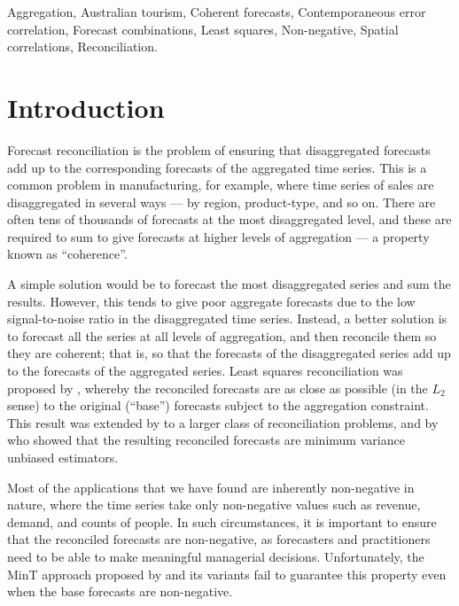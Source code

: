 \documentclass[11pt]{article}
\newcommand{\0}{\phantom{0}}
\begin{document}
\begin{keywords}
	Aggregation, Australian tourism, Coherent forecasts, Contemporaneous error correlation, Forecast combinations, Least squares, Non-negative, Spatial correlations, Reconciliation.
\end{keywords}

\newpage

\section{Introduction}

Forecast reconciliation is the problem of ensuring that disaggregated forecasts add up to the corresponding forecasts of the aggregated time series. This is a common problem in manufacturing, for example, where time series of sales are disaggregated in several ways --- by region, product-type, and so on. There are often tens of thousands of forecasts at the most disaggregated level, and these are required to sum to give forecasts at higher levels of aggregation --- a property known as ``coherence''.

A simple solution would be to forecast the most disaggregated series and sum the results. However, this tends to give poor aggregate forecasts due to the low signal-to-noise ratio in the disaggregated time series. Instead, a better solution is to forecast all the series at all levels of aggregation, and then reconcile them so they are coherent; that is, so that the forecasts of the disaggregated series add up to the forecasts of the aggregated series. Least squares reconciliation was proposed by \citet{Hyndman2011}, whereby the reconciled forecasts are as close as possible (in the $L_2$ sense) to the original (``base'') forecasts subject to the aggregation constraint. This result was extended by \citet{Hyndman2016} to a larger class of reconciliation problems, and by \citet{Wick2018} who showed that the resulting reconciled forecasts are minimum variance unbiased estimators.

Most of the applications that we have found are inherently non-negative in nature, where the time series take only non-negative values such as revenue, demand, and counts of people. In such circumstances, it is important to ensure that the reconciled forecasts are non-negative, as forecasters and practitioners need to be able to make meaningful managerial decisions. Unfortunately, the MinT approach proposed by \citet{Wick2018} and its variants fail to guarantee this property even when the base forecasts are non-negative.
\end{document}
